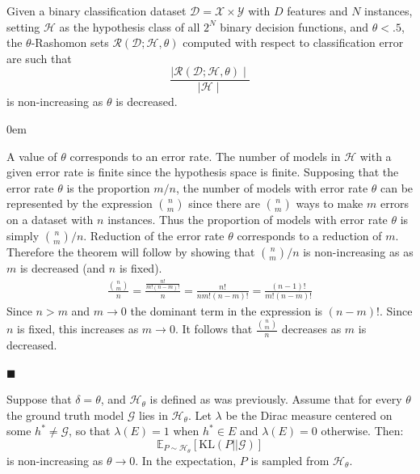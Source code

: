 \documentclass[12pt]{article}
\renewcommand{\qed}{\hfill$\blacksquare$}
\renewenvironment{proof}{\begin{addmargin}[1em]{0em}\begin{newproof}}{\end{newproof}\end{addmargin}\qed}
\newenvironment{theorem}[2][Theorem]{\begin{trivlist}
\item[\hskip \labelsep {\bfseries #1}\hskip \labelsep {\bfseries #2.}]}{\end{trivlist}}
\newenvironment{proposition}[2][Proposition]{\begin{trivlist}
\item[\hskip \labelsep {\bfseries #1}\hskip \labelsep {\bfseries #2.}]}{\end{trivlist}}
\begin{document}
 \begin{theorem}{(Easy Combinatorial Version)}
     Given a binary classification dataset $\mathcal{D}=\mathcal{X}\times \mathcal{Y}$ with $D$ features and $N$ instances, setting $\mathcal{H}$ as the hypothesis class of all $2^N$ binary decision functions, and $\theta < .5$, the $\theta$-Rashomon sets $\mathcal{R}(\mathcal{D};\mathcal{H},\theta)$ computed with respect to classification error are such that 
     \begin{equation*}
         \frac{\mid \mathcal{R}(\mathcal{D};\mathcal{H},\theta) \mid}{\mid \mathcal{H} \mid} 
     \end{equation*}
     is non-increasing as $\theta$ is decreased.
 \end{theorem}

\begin{proof}
    A value of $\theta$ corresponds to an error rate. The number of models in $\mathcal{H}$ with a given error rate is finite since the hypothesis space is finite. Supposing that the error rate $\theta$ is the proportion $m/n$, the number of models with error rate $\theta$ can be represented by the expression ${n \choose m}$ since there are $n \choose m$ ways to make $m$ errors on a dataset with $n$ instances. Thus the proportion of models with error rate $\theta$ is simply ${n \choose m}/{n}$. Reduction of the error rate $\theta$ corresponds to a reduction of $m$. Therefore the theorem will follow by showing that ${n \choose m}/n$ is non-increasing as as $m$ is decreased (and $n$ is fixed).
    \begin{gather*}
        \frac{{n\choose m}}{n} = \frac{\frac{n!}{m!(n-m)!}}{n} = \frac{n!}{nm!(n-m)!} = \frac{(n-1)!}{m!(n-m)!}
    \end{gather*}
    Since $n>m$ and $m \rightarrow 0$ the dominant term in the expression is $(n-m)!$. Since $n$ is fixed, this increases as $m\rightarrow 0$. It follows that $\frac{{n\choose m}}{n}$ decreases as $m$ is decreased. 
\end{proof}

\pagebreak



\begin{proposition}{1}
     Suppose that $\delta=\theta$, and $\mathcal{H}_\theta$ is defined as was previously. Assume that for every $\theta$ the ground truth model $\mathcal{G}$ lies in $\mathcal{H}_\theta$. Let $\lambda$ be the Dirac measure centered on some $h^* \neq \mathcal{G}$, so that $\lambda(E)=1$ when $h^*\in E$ and $\lambda(E)=0$ otherwise. Then:
    \begin{equation*}
        \mathds{E}_{P \sim \mathcal{H}_\theta}[\text{KL}(P || \mathcal{G})]
    \end{equation*}
    is non-increasing as $\theta \rightarrow 0$. In the expectation, $P$ is  sampled from $\mathcal{H}_\theta$. 
\end{proposition}
\end{document}
